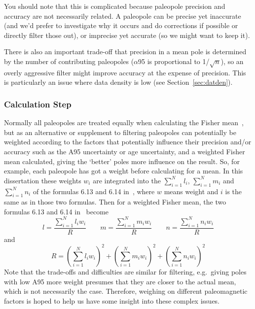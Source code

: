 You should note that this is complicated because paleopole precision and
accuracy are not necessarily related. A paleopole can be precise yet inaccurate
(and we'd prefer to investigate why it occurs and do corrections if possible or
directly filter those out), or imprecise yet accurate (so we might want to keep
it).

There is also an important trade-off that precision in a mean pole is determined
by the number of contributing paleopoles ($\alpha$95 is proportional to
1/$\sqrt{n}$), so an overly aggressive filter might improve accuracy at the
expense of precision. This is particularly an issue where data density is low
(see Section~\ref{sec:datden}).

\subsubsection{Calculation Step}

Normally all paleopoles are treated equally when calculating the Fisher
mean~\citep[see how to calculate a Fisher mean using the formulas 6.12, 6.13,
6.14 and 6.15 in][chap. 6; note that instead of direction declination and
inclination expected in those formulas, pole longitude and latitude should be
used]{B92}, but as an alternative or supplement to filtering paleopoles can
potentially be weighted according to the factors that potentially influence
their precision and/or accuracy such as the A95 uncertainty or age uncertainty,
and a weighted Fisher mean calculated, giving the `better' poles more influence
on the result. So, for example, each paleopole has got a weight before
calculating for a mean. In this dissertation these weights $w_i$ are integrated
into the $\sum\limits_{i=1}^N l_i$, $\sum\limits_{i=1}^N m_i$ and
$\sum\limits_{i=1}^N n_i$ of the formulas 6.13 and 6.14 in~\citet[chap.~6]{B92},
where $w$ means weight and $i$ is the same as in those two formulas. Then for a
weighted Fisher mean, the two formulas 6.13 and 6.14 in~\citet[chap.~6]{B92}
become
%
\begin{equation}
l = \frac{\sum\limits_{i=1}^N l_iw_i}{R} \quad\quad
m = \frac{\sum\limits_{i=1}^N m_iw_i}{R} \quad\quad
n = \frac{\sum\limits_{i=1}^N n_iw_i}{R}
\end{equation}
%
and
%
\begin{equation}
  R = (\sum\limits_{i=1}^N l_iw_i)^2
      + (\sum\limits_{i=1}^N m_iw_i)^2
      + (\sum\limits_{i=1}^N n_iw_i)^2
\end{equation}
%
Note that the trade-offs and difficulties are similar for filtering, e.g.\
giving poles with low A95 more weight presumes that they are closer to the
actual mean, which is not necessarily the case. Therefore, weighing on different
paleomagnetic factors is hoped to help us have some insight into these complex
issues.

